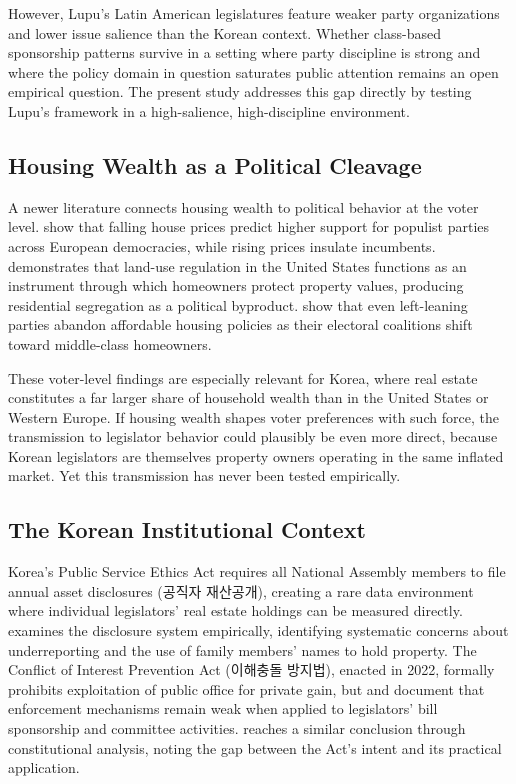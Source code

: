 \documentclass[11pt]{article}
\begin{document}
However, Lupu's Latin American legislatures feature weaker party organizations and lower issue salience than the Korean context. Whether class-based sponsorship patterns survive in a setting where party discipline is strong and where the policy domain in question saturates public attention remains an open empirical question. The present study addresses this gap directly by testing Lupu's framework in a high-salience, high-discipline environment.

\subsection{Housing Wealth as a Political Cleavage}

A newer literature connects housing wealth to political behavior at the voter level. \citet{ansell2021} show that falling house prices predict higher support for populist parties across European democracies, while rising prices insulate incumbents. \citet{trounstine2020} demonstrates that land-use regulation in the United States functions as an instrument through which homeowners protect property values, producing residential segregation as a political byproduct. \citet{chou2021} show that even left-leaning parties abandon affordable housing policies as their electoral coalitions shift toward middle-class homeowners.

These voter-level findings are especially relevant for Korea, where real estate constitutes a far larger share of household wealth than in the United States or Western Europe. If housing wealth shapes voter preferences with such force, the transmission to legislator behavior could plausibly be even more direct, because Korean legislators are themselves property owners operating in the same inflated market. Yet this transmission has never been tested empirically.

\subsection{The Korean Institutional Context}

Korea's Public Service Ethics Act requires all National Assembly members to file annual asset disclosures (공직자 재산공개), creating a rare data environment where individual legislators' real estate holdings can be measured directly. \citet{jung2020} examines the disclosure system empirically, identifying systematic concerns about underreporting and the use of family members' names to hold property. The Conflict of Interest Prevention Act (이해충돌 방지법), enacted in 2022, formally prohibits exploitation of public office for private gain, but \citet{cho2021} and \citet{halee2023} document that enforcement mechanisms remain weak when applied to legislators' bill sponsorship and committee activities. \citet{park2021} reaches a similar conclusion through constitutional analysis, noting the gap between the Act's intent and its practical application.
\end{document}
